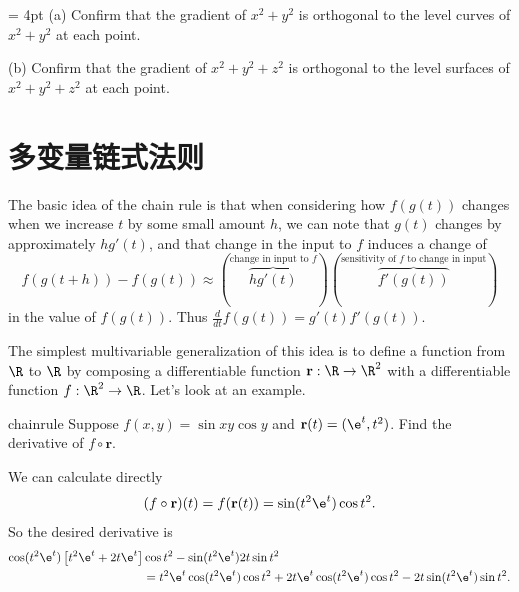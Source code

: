 \documentclass[indent]{watsonbook}
\begin{document}
{\begin{exercise}{}{} \parskip = 4pt
  (a) Confirm that the gradient of $x^2 + y^2$ is orthogonal to the level
  curves of $x^2 + y^2$ at each point.

  (b) Confirm that the gradient of
  $x^2 + y^2 + z^2 $ is orthogonal to the level surfaces of
  $x^2 + y^2 + z^2$ at each point.
\end{exercise}

\section{多变量链式法则} \label{sec:chainrule}


The basic idea of the chain rule is that when considering how
$f(g(t))$ changes when we increase $t$ by some small amount $h$, we
can note that $g(t)$ changes by approximately $hg'(t)$, and that
change in the input to $f$ induces a change of
\[
  f(g(t+h)) - f(g(t)) \approx \left(
    \overbrace{hg'(t)}^{\text{change in input to $f$}}
  \right) \left(
    \overbrace{f'(g(t))}^{\text{sensitivity of
        $f$ to change in input}}
  \right)
\]
in the value of $f(g(t))$. Thus $\tfrac{{d}}{{d} t} f(g(t)) =
g'(t)f'(g(t))$.

The simplest multivariable generalization of this idea is to define a
function from $\R$ to $\R$ by composing a differentiable function $\mathbf{r}: \R \to \R^2$ with a differentiable function $f: \R^2 \to \R$. Let's look at an example.

\begin{example}{}{chainrule}
  Suppose $f(x,y) = \sin xy \cos y$ and $\mathbf{r}(t) = (\e^t,
  t^2)$. Find the derivative of $f \circ \mathbf{r}$.
\end{example}

\begin{solution}
  We can calculate directly
  \[
    (f \circ \mathbf{r})(t) = f(\mathbf{r}(t)) = \sin (t^2\e^t) \cos
    t^2.
  \]
  So the desired derivative is
  \begin{align*}
    \cos(t^2\e^t)\left[ t^2 \e^t + 2t\e^t\right] &\cos t^2  -
     \sin(t^2 \e^t) 2t \sin t^2  \\
    &=t^2 \e^t \cos(t^2 \e^t) \cos t^2 + 2t\e^t \cos(t^2 \e^t) \cos t^2 -
                           2t \sin(t^2 \e^t) \sin t^2.
  \end{align*}
\end{solution}

}
\end{document}
